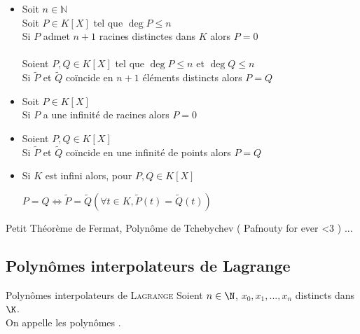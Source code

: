 \documentclass[12pt,a4paper]{report}
\begin{document}
        \begin{corollaire}{}{}
        \begin{itemize}
            \item Soit $n\in \mathbb{N}$ \\
            Soit $P\in K[X]$ tel que $\deg P \leq n$\\
            Si $P$ admet $n+1$ racines distinctes dans $K$ alors $P=0$\\
            \\
            Soient $P,Q\in K[X]$ tel que $\deg P \leq n$ et $\deg Q \leq n$\\
            Si $\widetilde{P}$ et $\widetilde{Q}$ coïncide en $n+1$ éléments distincts alors $P=Q$
            \item Soit $P\in K[X]$\\
            Si $P$ a une infinité de racines alors $P=0$
            \item Soient $P,Q\in K[X]$\\
            Si $\widetilde{P}$ et $\widetilde{Q}$ coïncide en une infinité de points alors $P=Q$
            \item Si $K$ est infini alors, pour $P,Q\in K[X]$
            \begin{center}
                $P=Q \Longleftrightarrow \widetilde{P}=\widetilde{Q} (\forall t\in K, \widetilde{P}(t)=\widetilde{Q}(t))$
            \end{center}
        \end{itemize}
        \end{corollaire}
    
        \begin{application}{}{}
        Petit Théorème de Fermat, Polynôme de Tchebychev ( Pafnouty for ever <3 ) ...  
        \end{application}

    \subsection{Polynômes interpolateurs de Lagrange}
        \begin{definition}{Polynômes interpolateurs de \textsc{Lagrange}}{}
        Soient $n \in \N$, $x_0, x_1, ..., x_n$ distincts dans $\K$.\\
        On appelle  les polynômes .
        \end{definition}
        
\end{document}
